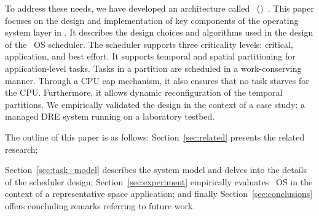 
To address these needs, we have developed an architecture called
 \iapfull\ (\iap)~\cite{6899124}.
This paper focuses on the design and implementation of key components of the operating system layer in \iap.
 It describes the design choices and algorithms used in the design of the \iap\ OS scheduler.  The scheduler supports three criticality levels: critical, application, and best effort.  It  supports temporal and spatial partitioning for application-level
  tasks.   Tasks in a partition are scheduled in a work-conserving   manner.  Through a CPU cap mechanism, it also ensures that no task  starves for the CPU. Furthermore, it allows dynamic reconfiguration of the temporal partitions. We  empirically validated the design in the context of a case study: a managed DRE system running on a laboratory testbed.

The outline of this paper is as follows: Section~\ref{sec:related}
presents the related research; 
\iffalse
Section~\ref{sec:task_model} provides
background information and the system model;
Section~\ref{sec:scheduler} onwards the scheduler design is presented;
\fi
Section~\ref{sec:task_model} describes the system model and delves
into the details of the scheduler design;
Section~\ref{sec:experiment} empirically evaluates \iap\ OS in the
context of a representative space application; and finally
Section~\ref{sec:conclusions} offers concluding remarks referring to
future work.  
